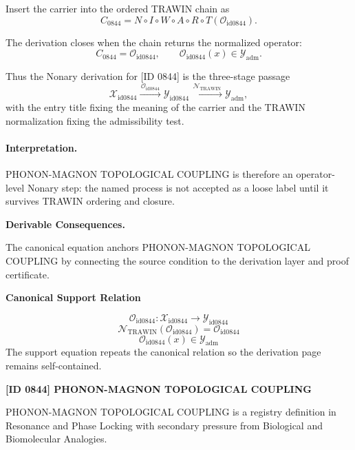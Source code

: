 Insert the carrier into the ordered TRAWIN chain as\[
C_{0844}=N\circ I\circ W\circ A\circ R\circ T(\mathcal{O}_{\mathrm{id0844}}).
\]

The derivation closes when the chain returns the normalized operator:\[
C_{0844}=\mathcal{O}_{\mathrm{id0844}},\qquad \mathcal{O}_{\mathrm{id0844}}(x)\in\mathcal{Y}_{\mathrm{adm}}.
\]

Thus the Nonary derivation for [ID 0844] is the three-stage passage
\[
\mathcal{X}_{\mathrm{id0844}}\xrightarrow{\,\mathcal{O}_{\mathrm{id0844}}\,} \mathcal{Y}_{\mathrm{id0844}}\xrightarrow{\,\mathcal{N}_{\mathrm{TRAWIN}}\,} \mathcal{Y}_{\mathrm{adm}},
\]
with the entry title fixing the meaning of the carrier and the TRAWIN normalization fixing the admissibility test.

\paragraph{Interpretation.} PHONON-MAGNON TOPOLOGICAL COUPLING is therefore an operator-level Nonary step: the named process is not accepted as a loose label until it survives TRAWIN ordering and closure.

\par\vspace{0.35em}
\noindent\textbf{Derivable Consequences.}\quad
\begingroup
\footnotesize
\raggedright
The canonical equation anchors PHONON-MAGNON TOPOLOGICAL COUPLING by connecting the source condition to the derivation layer and proof certificate.
\par\endgroup

\noindent\textbf{Canonical Support Relation}\par
\[
\mathcal{O}_{\mathrm{id0844}}:\mathcal{X}_{\mathrm{id0844}}\longrightarrow\mathcal{Y}_{\mathrm{id0844}}
\]
\[
\mathcal{N}_{\mathrm{TRAWIN}}(\mathcal{O}_{\mathrm{id0844}})=\mathcal{O}_{\mathrm{id0844}}
\]
\[
\mathcal{O}_{\mathrm{id0844}}(x)\in\mathcal{Y}_{\mathrm{adm}}
\]
\noindent The support equation repeats the canonical relation so the derivation page remains self-contained.\par

\clearpage
\noindent\textbf{[ID 0844] PHONON-MAGNON TOPOLOGICAL COUPLING}\par
\vspace{0.35em}
\begingroup\small
{}
PHONON-MAGNON TOPOLOGICAL COUPLING is a registry definition in Resonance and Phase Locking with secondary pressure from Biological and Biomolecular Analogies.

